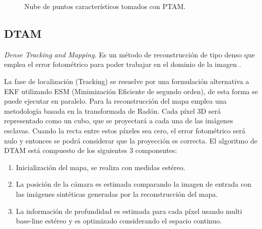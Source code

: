 \begin{figure}[H]
\begin{center}
\end{center}
\caption{Nube de puntos característicos tomados con PTAM.}
\end{figure}



\subsection{DTAM}
\textit {Dense Tracking and Mapping}. Es un método de reconstrucción de tipo denso que emplea el error fotométrico para poder trabajar en el dominio de la imagen 
\cite{Newcombe2011dtam}.

La fase de localización (Tracking) se resuelve por una formulación alternativa a EKF utilizando ESM (Minimización Eficiente de segundo orden), de esta forma se puede ejecutar en paralelo.
Para la reconstrucción del mapa emplea una metodología basada en la transformada de Radón. Cada píxel 3D será representado como un cubo, que se proyectará a cada una de las imágenes esclavas. Cuando la recta entre estos píxeles sea cero, el error fotométrico será nulo y entonces se podrá considerar que la proyección es correcta.
El algoritmo de DTAM está compuesto de los siguientes 3 componentes:
\begin{enumerate}
\item Inicialización del mapa, se realiza con medidas estéreo.

\item La posición de la cámara es estimada comparando la imagen de entrada con las imágenes sintéticas generadas por la reconstrucción del mapa.

\item La información de profundidad es estimada para cada píxel usando multi base-line estéreo y es optimizado considerando el espacio continuo.
\end{enumerate}

